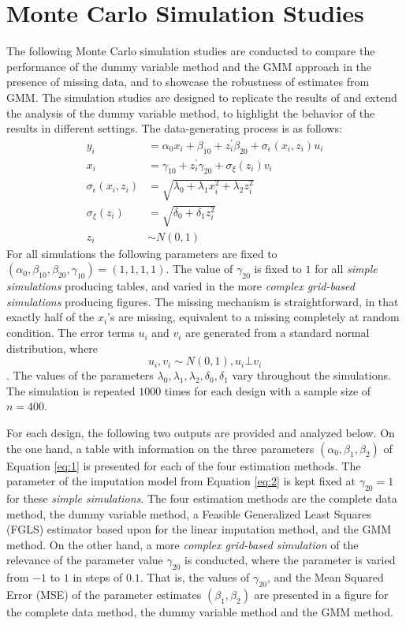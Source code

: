 \section{Monte Carlo Simulation Studies}
The following Monte Carlo simulation studies are conducted to compare the performance of the dummy variable method and the GMM approach in the presence of missing data, and to showcase the robustness of estimates from GMM.
The simulation studies are designed to replicate the results of \cite{abrevaya2017} and extend the analysis of the dummy variable method, to highlight the behavior of the results in different settings.
The data-generating process is as follows:
\begin{align*}
    y_i & = \alpha_0 x_i + \beta_{10} + z_i^{\prime} \beta_{20} + \sigma_{\epsilon}(x_i, z_i) u_i \\
    x_i & = \gamma_{10} + z_i^{\prime} \gamma_{20} + \sigma_{\xi}(z_i) v_i \\
    \sigma_{\epsilon}(x_i, z_i) & = \sqrt{\lambda_0 + \lambda_1 x_i^2 + \lambda_2 z_i^2} \\
    \sigma_{\xi}(z_i) & = \sqrt{\delta_0 + \delta_1 z_i^2} \\
    z_i & \sim N(0, 1)
\end{align*}
For all simulations the following parameters are fixed to $(\alpha_0, \beta_{10}, \beta_{20}, \gamma_{10}) = (1,1,1,1)$.
The value of $\gamma_{20}$ is fixed to $1$ for all \textit{simple simulations} producing tables, and varied in the more \textit{complex grid-based simulations} producing figures.
The missing mechanism is straightforward, in that exactly half of the $x_i$'s are missing, equivalent to a missing completely at random condition.
The error terms $u_i$ and $v_i$ are generated from a standard normal distribution, where $$u_i, v_i \sim N(0, 1), u_i \bot v_i$$.
The values of the parameters $\lambda_0, \lambda_1, \lambda_2, \delta_0, \delta_1$ vary throughout the simulations.
The simulation is repeated $1000$ times for each design with a sample size of $n = 400$.

For each design, the following two outputs are provided and analyzed below.
On the one hand, a table with information on the three parameters $(\alpha_0, \beta_1, \beta_2)$ of Equation \eqref{eq:1} is presented for each of the four estimation methods.
The parameter of the imputation model from Equation \eqref{eq:2} is kept fixed at $\gamma_{20} = 1$ for these \textit{simple simulations}.
The four estimation methods are the complete data method, the dummy variable method, a Feasible Generalized Least Squares (FGLS) estimator based upon \citet{dagenais1973} for the linear imputation method, and the GMM method.
On the other hand, a more \textit{complex grid-based simulation} of the relevance of the parameter value $\gamma_{20}$ is conducted, where the parameter is varied from $-1$ to $1$ in steps of $0.1$.
That is, the values of $\gamma_{20}$, and the Mean Squared Error (MSE) of the parameter estimates $(\beta_1, \beta_2)$ are presented in a figure for the complete data method, the dummy variable method and the GMM method.

